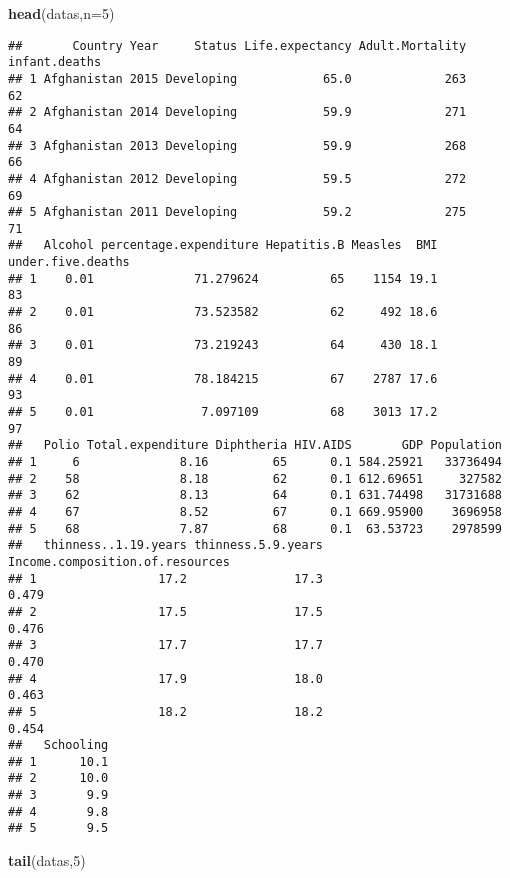 \documentclass[
]{article}
\newenvironment{Shaded}{\begin{snugshade}}{\end{snugshade}}
\newcommand{\AttributeTok}[1]{\textcolor[rgb]{0.13,0.29,0.53}{#1}}
\newcommand{\DecValTok}[1]{\textcolor[rgb]{0.00,0.00,0.81}{#1}}
\newcommand{\FunctionTok}[1]{\textcolor[rgb]{0.13,0.29,0.53}{\textbf{#1}}}
\newcommand{\NormalTok}[1]{#1}
\begin{document}
\begin{Shaded}
\begin{Highlighting}[]
\FunctionTok{head}\NormalTok{(datas,}\AttributeTok{n=}\DecValTok{5}\NormalTok{)}
\end{Highlighting}
\end{Shaded}

\begin{verbatim}
##       Country Year     Status Life.expectancy Adult.Mortality infant.deaths
## 1 Afghanistan 2015 Developing            65.0             263            62
## 2 Afghanistan 2014 Developing            59.9             271            64
## 3 Afghanistan 2013 Developing            59.9             268            66
## 4 Afghanistan 2012 Developing            59.5             272            69
## 5 Afghanistan 2011 Developing            59.2             275            71
##   Alcohol percentage.expenditure Hepatitis.B Measles  BMI under.five.deaths
## 1    0.01              71.279624          65    1154 19.1                83
## 2    0.01              73.523582          62     492 18.6                86
## 3    0.01              73.219243          64     430 18.1                89
## 4    0.01              78.184215          67    2787 17.6                93
## 5    0.01               7.097109          68    3013 17.2                97
##   Polio Total.expenditure Diphtheria HIV.AIDS       GDP Population
## 1     6              8.16         65      0.1 584.25921   33736494
## 2    58              8.18         62      0.1 612.69651     327582
## 3    62              8.13         64      0.1 631.74498   31731688
## 4    67              8.52         67      0.1 669.95900    3696958
## 5    68              7.87         68      0.1  63.53723    2978599
##   thinness..1.19.years thinness.5.9.years Income.composition.of.resources
## 1                 17.2               17.3                           0.479
## 2                 17.5               17.5                           0.476
## 3                 17.7               17.7                           0.470
## 4                 17.9               18.0                           0.463
## 5                 18.2               18.2                           0.454
##   Schooling
## 1      10.1
## 2      10.0
## 3       9.9
## 4       9.8
## 5       9.5
\end{verbatim}

\begin{Shaded}
\begin{Highlighting}[]
\FunctionTok{tail}\NormalTok{(datas,}\DecValTok{5}\NormalTok{)}
\end{Highlighting}
\end{Shaded}
\end{document}
